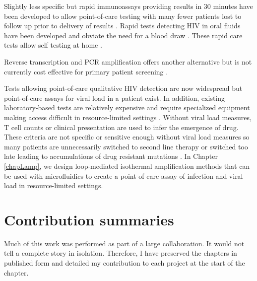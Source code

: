 \documentclass[../sherrill-Mix_thesis.tex]{subfiles}
\begin{document}
	Slightly less specific but rapid immunoassays providing results in 30 minutes have been developed to allow point-of-care testing with many fewer patients lost to follow up prior to delivery of results \citep{Kassler1995,CDCP1998,CDCP2002}. Rapid tests detecting HIV in oral fluids have been developed and obviate the need for a blood draw \citep{Gallo1997,Delaney2006,SemaBaltazar2014}. These rapid care tests allow self testing at home \citep{Granade2004,PantPai2013}.

	Reverse transcription and PCR amplification offers another alternative \citep{Hart1988,Ou1988} but is not currently cost effective for primary patient screening \citep{Long2011}.

	Tests allowing point-of-care qualitative HIV detection are now widespread but point-of-care assays for viral load in a patient exist. In addition, existing laboratory-based tests are relatively expensive and require specialized equipment making access difficult in resource-limited settings \citep{Fiscus2006,Wang2010a}. Without viral load measures, \cdFour{} T cell counts or clinical presentation are used to infer the emergence of drug. These criteria are not specific or sensitive enough without viral load measures so many patients are unnecessarily switched to second line therapy \citep{Mee2008,VanOosterhout2009} or switched too late leading to accumulations of drug resistant mutations \citep{Hosseinipour2009}.  In Chapter \ref{chapLamp}, we design loop-mediated isothermal amplification methods that can be used with microfluidics to create a point-of-care assay of infection and viral load in resource-limited settings.

\section{Contribution summaries}
	Much of this work was performed as part of a large collaboration. It would not tell a complete story in isolation. Therefore, I have preserved the chapters in published form and detailed my contribution to each project at the start of the chapter.
\end{document}

